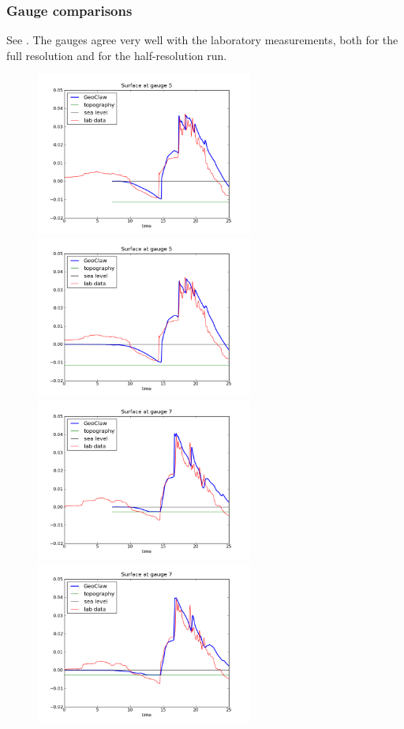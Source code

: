 
\subsubsection{Gauge comparisons}

See .  The gauges agree very well with the laboratory
measurements, both for the full resolution and for the half-resolution run.

\begin{figure}[ht]
\hfil\includegraphics[width=2.8in]{bp7/figs423/gauge0005fig300.png}\hfil
\hfil\includegraphics[width=2.8in]{bp7/figs211/gauge0005fig300.png}\hfil
\vskip 5pt
\hfil\includegraphics[width=2.8in]{bp7/figs423/gauge0007fig300.png}\hfil
\hfil\includegraphics[width=2.8in]{bp7/figs211/gauge0007fig300.png}\hfil

\end{figure}

